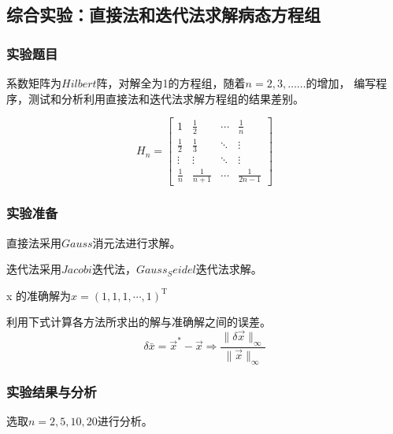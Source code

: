 \documentclass[UTF8]{ctexart}
\begin{document}
\subsection{综合实验：直接法和迭代法求解病态方程组}
\subsubsection{实验题目}
系数矩阵为$Hilbert$阵，对解全为1的方程组，随着$n = 2,3,……$的增加，
编写程序，测试和分析利用直接法和迭代法求解方程组的结果差别。

\begin{equation}\nonumber
    H_{n}=\left[\begin{array}{cccc}
        1 & \frac{1}{2} & \cdots & \frac{1}{n} \\
        \frac{1}{2} & \frac{1}{3} & \ddots & \vdots \\
        \vdots & \vdots & \ddots & \vdots \\
        \frac{1}{n} & \frac{1}{n+1} & \cdots & \frac{1}{2 n-1}
        \end{array}\right]
\end{equation}
\subsubsection{实验准备}
直接法采用$Gauss$消元法进行求解。

迭代法采用$Jacobi$迭代法，$Gauss_Seidel$迭代法求解。

x 的准确解为$x = (1, 1, 1, \cdots, 1)^{\mathrm{T}}$

利用下式计算各方法所求出的解与准确解之间的误差。
\begin{equation}\nonumber
        \delta \bar{x}=\vec{x}^{*}-\vec{x}\Rightarrow \frac{\|\delta \vec{x}\|_{\infty}}{\|\vec{x}\|_{\infty}}
\end{equation}
\subsubsection{实验结果与分析}
选取$n = 2, 5, 10, 20$进行分析。
\end{document}
